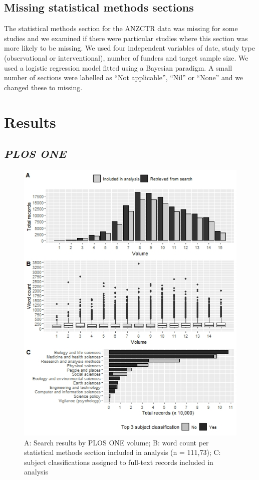 \documentclass[12pt]{article}
\begin{document}
\subsection{Missing statistical methods sections}

The statistical methods section for the ANZCTR data was missing for some
studies and we examined if there were particular studies where this
section was more likely to be missing. We used four independent
variables of date, study type (observational or interventional), number
of funders and target sample size. We used a logistic regression model
fitted using a Bayesian paradigm. A small number of sections were
labelled as ``Not applicable'', ``Nil'' or ``None'' and we changed these
to missing.

\hypertarget{results}{%
\section{Results}\label{results}}

\hypertarget{plos-one}{%
\subsection{\texorpdfstring{\emph{PLOS ONE}}{PLOS ONE}}\label{plos-one}}

\begin{figure}

{\centering \includegraphics[width=0.8\linewidth]{figures/plossummary.jpg} 

}

\caption{\label{fig:plos-n} A: Search results by PLOS ONE volume; B: word count per statistical methods section included in analysis (n = 111,73); C: subject classifications assigned to full-text records included in analysis}\label{fig:unnamed-chunk-3}
\end{figure}
\end{document}
